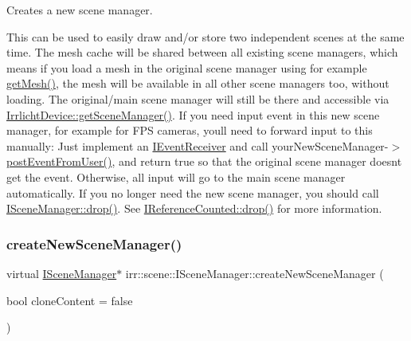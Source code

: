 Creates a new scene manager. 

This can be used to easily draw and/or store two independent scenes at the same time. The mesh cache will be shared between all existing scene managers, which means if you load a mesh in the original scene manager using for example \hyperlink{classirr_1_1scene_1_1ISceneManager_a63894c3f3d46cfc385116f1705935e03}{get\+Mesh()}, the mesh will be available in all other scene managers too, without loading. The original/main scene manager will still be there and accessible via \hyperlink{classirr_1_1IrrlichtDevice_a891b503ff4d5041296d88f23f97d7b3d}{Irrlicht\+Device\+::get\+Scene\+Manager()}. If you need input event in this new scene manager, for example for F\+PS cameras, you\textquotesingle{}ll need to forward input to this manually\+: Just implement an \hyperlink{classirr_1_1IEventReceiver}{I\+Event\+Receiver} and call your\+New\+Scene\+Manager-\/$>$\hyperlink{classirr_1_1scene_1_1ISceneManager_ac68aa8d654884f19ad52fa28f11db424}{post\+Event\+From\+User()}, and return true so that the original scene manager doesn\textquotesingle{}t get the event. Otherwise, all input will go to the main scene manager automatically. If you no longer need the new scene manager, you should call \hyperlink{classirr_1_1IReferenceCounted_a03856a09355b89d178090c4a5f738543}{I\+Scene\+Manager\+::drop()}. See \hyperlink{classirr_1_1IReferenceCounted_a03856a09355b89d178090c4a5f738543}{I\+Reference\+Counted\+::drop()} for more information. \mbox{\label{classirr_1_1scene_1_1ISceneManager_a94805dd4eca41ccef9607aefe669aed9}} 
\subsubsection{\texorpdfstring{create\+New\+Scene\+Manager()}{createNewSceneManager()}\hspace{0.1cm}{\footnotesize\ttfamily [2/2]}}
{\footnotesize\ttfamily virtual \hyperlink{classirr_1_1scene_1_1ISceneManager}{I\+Scene\+Manager}$\ast$ irr\+::scene\+::\+I\+Scene\+Manager\+::create\+New\+Scene\+Manager (\begin{DoxyParamCaption}\item[{bool}]{clone\+Content = {\ttfamily false} }\end{DoxyParamCaption})\hspace{0.3cm}{\ttfamily [pure virtual]}}



